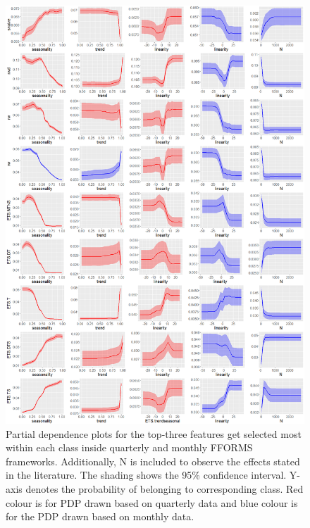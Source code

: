 \documentclass[11pt,a4paper,]{article}
\begin{document}
\newpage

\begin{figure}
\centering
\includegraphics{figures/pdpquarterly1-1.png}
\caption{\label{fig:pdpquarterly1}Partial dependence plots for the top-three
features get selected most within each class inside quarterly and
monthly FFORMS frameworks. Additionally, N is included to observe the
effects stated in the literature. The shading shows the 95\% confidence
interval. Y-axis denotes the probability of belonging to corresponding
class. Red colour is for PDP drawn based on quarterly data and blue
colour is for the PDP drawn based on monthly data.}
\end{figure}

\newpage
\end{document}
